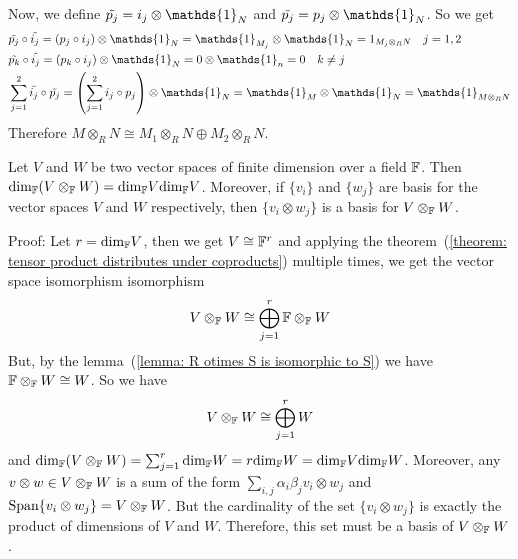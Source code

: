 Now, we define $\Tilde{p_j}=i_j\otimes \mathds{1}_N$ and $\Tilde{p_j}=p_j\otimes \mathds{1}_N$. So we get
\begin{equation}
    \begin{split}
        &\Tilde{p_j}\circ\Tilde{i_j}=(p_j\circ i_j)\otimes \mathds{1}_N = \mathds{1}_{M_j}\otimes \mathds{1}_N=1_{M_j\otimes_R N}\quad j=1,2\\
        &\Tilde{p_k}\circ\Tilde{i_j}=(p_k\circ i_j)\otimes \mathds{1}_N =0\otimes \mathds{1}_n=0\quad k\neq j\\
        &\sum_{j=1}^2\Tilde{i_j}\circ\Tilde{p_j}=\left(\sum_{j=1}^2 i_j\circ p_j \right)\otimes \mathds{1}_N=\mathds{1}_M\otimes\mathds{1}_N=\mathds{1}_{M\otimes_RN}
    \end{split}
\end{equation}
Therefore $M\otimes_RN\cong M_1\otimes_RN\oplus M_2\otimes_RN$.
\begin{dang}
    \begin{corollary}\label{corollary: basis of a tensor product of vector spaces}
        Let $V$ and $W$ be two vector spaces of finite dimension over a field $\mathbb{F}$. Then $\text{dim}_{\mathbb{F}}(V\otimes_{\mathbb{F}} W)=\text{dim}_{\mathbb{F}}V\text{dim}_{\mathbb{F}}V$. Moreover, if $\{v_i\}$ and $\{w_j\}$ are basis for the vector spaces $V$ and $W$ respectively, then $\{v_i\otimes w_j\}$ is a basis for $V\otimes_{\mathbb{F}} W$.
    \end{corollary}
\end{dang}
Proof: Let $r=\text{dim}_{\mathbb{F}}V$, then we get $V\cong \mathbb{F}^r$ and applying the theorem~(\ref{theorem: tensor product distributes under coproducts}) multiple times, we get the vector space isomorphism isomorphism
\begin{equation}
    V\otimes_{\mathbb{F}}W \cong \bigoplus_{j=1}^r\mathbb{F}\otimes_{\mathbb{F}} W
\end{equation}
But, by the lemma~(\ref{lemma: R otimes S is isomorphic to S}) we have $\mathbb{F}\otimes_{\mathbb{F}}W\cong W$. So we have
\begin{equation}
     V\otimes_{\mathbb{F}}W \cong \bigoplus_{j=1}^r W
\end{equation}
and $\text{dim}_{\mathbb{F}}(V\otimes_{\mathbb{F}}W)=\sum_{j=1}^r\text{dim}_{\mathbb{F}}W=r\text{dim}_{\mathbb{F}}W=\text{dim}_{\mathbb{F}}V\text{dim}_{\mathbb{F}}W$. Moreover, any $v\otimes w\in V\otimes_{\mathbb{F}}W$ is a sum of the form $\sum_{i,j}\alpha_i\beta_jv_i\otimes w_j$ and $\text{Span}\{v_i\otimes w_j\}= V\otimes_{\mathbb{F}}W$. But the cardinality of the set $\{v_i\otimes w_j\}$ is exactly the product of dimensions of $V$ and $W$. Therefore, this set must be a basis of $V\otimes_{\mathbb{F}}W$.
